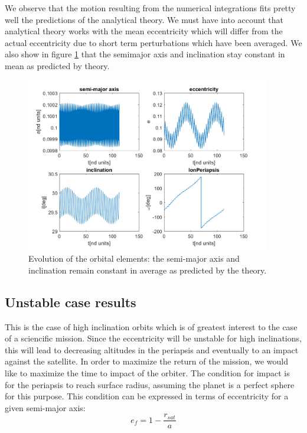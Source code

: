 We observe that the motion resulting from the numerical integrations fits pretty well the predictions of the analytical theory. We must have into account that analytical theory works with the mean eccentricity which will differ from the actual eccentricity due to short term perturbations which have been averaged. We also show in figure \ref{fig:stableEelements} that the semimajor axis and inclination stay constant in mean as predicted by theory.

\begin{figure}[H]
	\centering
	\includegraphics[height=3in]
	{figures/Europe400km01e30i/elements.png}
	\caption{Evolution of the orbital elements: the semi-major axis and inclination remain constant in average as predicted by the theory.}
	\label{fig:stableEelements}
\end{figure}

\subsection{Unstable case results}

This is the case of high inclination orbits which is of greatest interest to the case of a sciencific mission. Since the eccentricity will be unstable for high inclinations, this will lead to decreasing altitudes in the periapsis and eventually to an impact against the satellite. In order to maximize the return of the mission, we would like to maximize the time to impact of the orbiter. The condition for impact is for the periapsis to reach surface radius, assuming the planet is a perfect sphere for this purpose. This condition can be expressed in terms of eccentricity for a given semi-major axis:
\begin{equation}
e_f = 1-\frac{r_{sat}}{a}
\end{equation}


